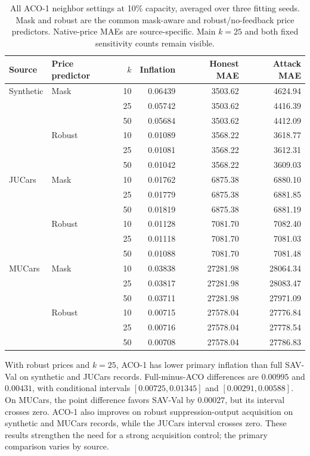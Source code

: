 \documentclass[10pt,journal]{IEEEtran}
\begin{document}
\begin{table}[t]
\centering
\caption{All ACO-1 neighbor settings at 10\% capacity, averaged over three
fitting seeds. Mask and robust are the common mask-aware and robust/no-feedback
price predictors. Native-price MAEs are source-specific. Main $k=25$ and
both fixed sensitivity counts remain visible.}
\label{tab:aco_primary}
\begin{tabular}{llrrrr}
\toprule
Source & Price predictor & $k$ & Inflation & Honest MAE & Attack MAE\\
\midrule
Synthetic & Mask & 10 & 0.06439 & 3503.62 & 4624.94\\
 &  & 25 & 0.05742 & 3503.62 & 4416.39\\
 &  & 50 & 0.05684 & 3503.62 & 4412.09\\
 & Robust & 10 & 0.01089 & 3568.22 & 3618.77\\
 &  & 25 & 0.01081 & 3568.22 & 3612.31\\
 &  & 50 & 0.01042 & 3568.22 & 3609.03\\
\midrule
JUCars & Mask & 10 & 0.01762 & 6875.38 & 6880.10\\
 &  & 25 & 0.01779 & 6875.38 & 6881.85\\
 &  & 50 & 0.01819 & 6875.38 & 6881.19\\
 & Robust & 10 & 0.01128 & 7081.70 & 7082.40\\
 &  & 25 & 0.01118 & 7081.70 & 7081.03\\
 &  & 50 & 0.01088 & 7081.70 & 7081.48\\
\midrule
MUCars & Mask & 10 & 0.03838 & 27281.98 & 28064.34\\
 &  & 25 & 0.03817 & 27281.98 & 28083.47\\
 &  & 50 & 0.03711 & 27281.98 & 27971.09\\
 & Robust & 10 & 0.00715 & 27578.04 & 27776.84\\
 &  & 25 & 0.00716 & 27578.04 & 27778.54\\
 &  & 50 & 0.00708 & 27578.04 & 27786.83\\
\bottomrule
\end{tabular}
\end{table}

With robust prices and $k=25$, ACO-1 has lower primary inflation than full
SAV-Val on synthetic and JUCars records. Full-minus-ACO differences are
$0.00995$ and $0.00431$, with conditional intervals
$[0.00725,0.01345]$ and $[0.00291,0.00588]$. On MUCars, the point difference
favors SAV-Val by $0.00027$, but its interval crosses zero. ACO-1 also
improves on robust suppression-output acquisition on synthetic and MUCars
records, while the JUCars interval crosses zero. These results strengthen
the need for a strong acquisition control; the primary comparison varies by source.
\end{document}
